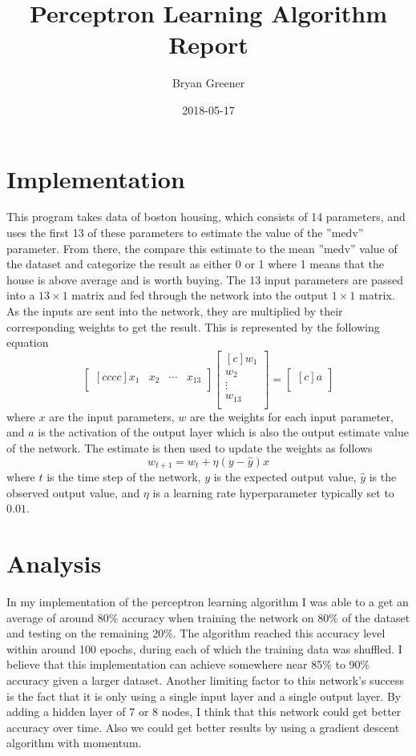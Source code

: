 \documentclass{article}
\title{Perceptron Learning Algorithm Report}
\author{Bryan Greener}
\date{2018-05-17}
\theoremstyle{plain} %
\theoremstyle{definition} %
\theoremstyle{plain} %
\begin{document}
\maketitle

\section*{Implementation}
This program takes data of boston housing, which consists of 14 parameters, and uses the first 13 of these parameters to estimate the value of the ''medv'' parameter. From there, the compare this estimate to the mean ''medv'' value of the dataset and categorize the result as either 0 or 1 where 1 means that the house is above average and is worth buying. The 13 input parameters are passed into a $13\times 1$ matrix and fed through the network into the output $1\times 1$ matrix. As the inputs are sent into the network, they are multiplied by their corresponding weights to get the result. This is represented by the following equation
\[ \begin{bmatrix}[cccc]x_1&x_2&\cdots&x_{13}\\\end{bmatrix}\begin{bmatrix}[c]w_1\\w_2\\\vdots\\w_{13}\\\end{bmatrix} = \begin{bmatrix}[c]a\\\end{bmatrix} \]
where $x$ are the input parameters, $w$ are the weights for each input parameter, and $a$ is the activation of the output layer which is also the output estimate value of the network. The estimate is then used to update the weights as follows
\[ w_{t+1} = w_{t} + \eta(y - \hat{y})x \]
where $t$ is the time step of the network, $y$ is the expected output value, $\hat{y}$ is the observed output value, and $\eta$ is a learning rate hyperparameter typically set to $0.01$.

\section*{Analysis}
In my implementation of the perceptron learning algorithm I was able to a get an average of around 80\% accuracy when training the network on 80\% of the dataset and testing on the remaining 20\%. The algorithm reached this accuracy level within around 100 epochs, during each of which the training data was shuffled. I believe that this implementation can achieve somewhere near 85\% to 90\% accuracy given a larger dataset. Another limiting factor to this network's success is the fact that it is only using a single input layer and a single output layer. By adding a hidden layer of 7 or 8 nodes, I think that this network could get better accuracy over time. Also we could get better results by using a gradient descent algorithm with momentum. 
\end{document}
